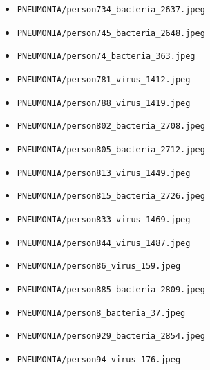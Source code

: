 \begin{itemize}
\item \texttt{PNEUMONIA/person734\_bacteria\_2637.jpeg}
\item \texttt{PNEUMONIA/person745\_bacteria\_2648.jpeg}
\item \texttt{PNEUMONIA/person74\_bacteria\_363.jpeg}
\item \texttt{PNEUMONIA/person781\_virus\_1412.jpeg}
\item \texttt{PNEUMONIA/person788\_virus\_1419.jpeg}
\item \texttt{PNEUMONIA/person802\_bacteria\_2708.jpeg}
\item \texttt{PNEUMONIA/person805\_bacteria\_2712.jpeg}
\item \texttt{PNEUMONIA/person813\_virus\_1449.jpeg}
\item \texttt{PNEUMONIA/person815\_bacteria\_2726.jpeg}
\item \texttt{PNEUMONIA/person833\_virus\_1469.jpeg}
\item \texttt{PNEUMONIA/person844\_virus\_1487.jpeg}
\item \texttt{PNEUMONIA/person86\_virus\_159.jpeg}
\item \texttt{PNEUMONIA/person885\_bacteria\_2809.jpeg}
\item \texttt{PNEUMONIA/person8\_bacteria\_37.jpeg}
\item \texttt{PNEUMONIA/person929\_bacteria\_2854.jpeg}
\item \texttt{PNEUMONIA/person94\_virus\_176.jpeg}
\end{itemize}
